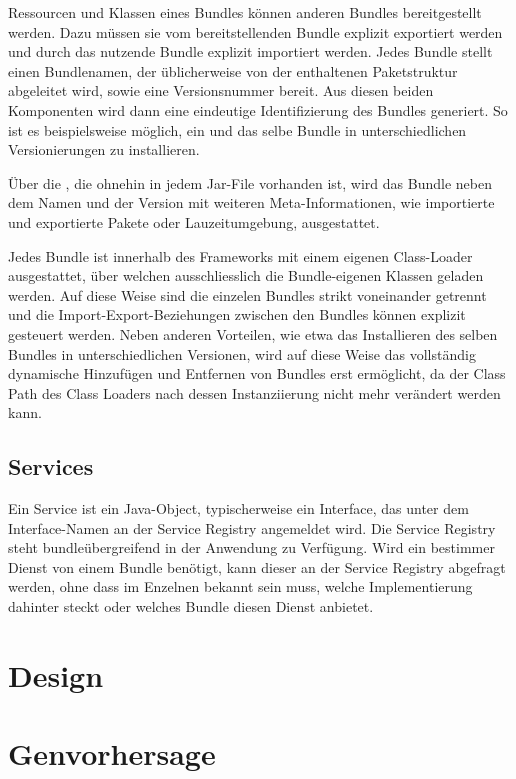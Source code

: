 Ressourcen und Klassen
eines Bundles können anderen Bundles bereitgestellt werden. Dazu müssen sie vom
bereitstellenden Bundle explizit exportiert werden und durch das nutzende
Bundle explizit importiert werden. Jedes Bundle stellt einen
Bundlenamen, der üblicherweise von der enthaltenen Paketstruktur
abgeleitet wird, sowie eine Versionsnummer bereit. Aus diesen beiden Komponenten
wird dann eine eindeutige Identifizierung des Bundles generiert.
So ist es beispielsweise möglich, ein und das selbe Bundle in unterschiedlichen
Versionierungen zu installieren.

Über die , die ohnehin in jedem Jar-File vorhanden ist, wird
das Bundle neben dem Namen und der Version mit weiteren Meta-Informationen, wie
importierte und exportierte Pakete oder Lauzeitumgebung, ausgestattet.

Jedes Bundle ist innerhalb des Frameworks mit einem eigenen Class-Loader
ausgestattet, über welchen ausschliesslich die Bundle-eigenen Klassen geladen
werden. Auf diese Weise sind die einzelen Bundles strikt voneinander getrennt und die
Import-Export-Beziehungen zwischen den Bundles können explizit gesteuert
werden. 
Neben anderen Vorteilen, wie etwa das Installieren des selben Bundles in
unterschiedlichen Versionen, wird auf diese Weise das vollständig
dynamische Hinzufügen und Entfernen von Bundles erst ermöglicht, da der
Class Path des Class Loaders nach dessen Instanziierung nicht mehr verändert
werden kann.
\citep{wtherich_die_2008}

\subsection{Services} %
Ein Service ist ein Java-Object, typischerweise ein Interface, das unter dem
Interface-Namen an der Service Registry angemeldet wird.
Die Service Registry steht bundleübergreifend in der Anwendung zu Verfügung.
Wird ein bestimmer Dienst von einem Bundle benötigt, kann dieser an der Service
Registry abgefragt werden, ohne dass im Enzelnen bekannt sein muss, welche
Implementierung dahinter steckt oder welches Bundle diesen Dienst anbietet.
\citep{wtherich_die_2008}
\section{Design}
\section{Genvorhersage}
